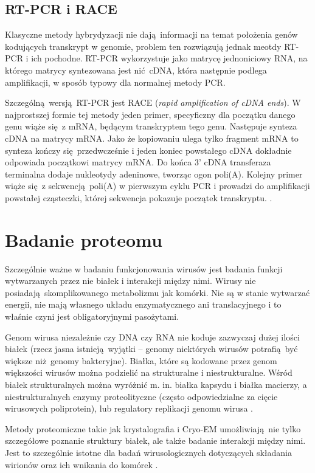 \documentclass[two column, twoside, a4paper]{article}
\begin{document}
\subsection{RT-PCR i RACE}

Klasyczne metody hybrydyzacji nie dają informacji na temat położenia genów kodujących transkrypt w genomie, problem ten rozwiązują jednak meotdy RT-PCR i ich pochodne. RT-PCR wykorzystuje jako matrycę jednoniciowy RNA, na którego matrycy syntezowana jest nić cDNA, która następnie podlega amplifikacji, w sposób typowy dla normalnej metody PCR.

Szczególną wersją RT-PCR jest RACE (\textit{rapid amplification of cDNA ends}). W najprostszej formie tej metody jeden primer, specyficzny dla początku danego genu  wiąże się z mRNA, będącym transkryptem tego genu. Następuje synteza cDNA na matrycy mRNA. Jako że kopiowaniu ulega tylko fragment mRNA to synteza kończy się przedwcześnie i jeden koniec powstałego cDNA dokładnie odpowiada początkowi matrycy mRNA. Do końca 3' cDNA transferaza terminalna dodaje nukleotydy adeninowe, tworząc ogon poli(A). Kolejny primer wiąże się z sekwencją poli(A) w pierwszym cyklu PCR i prowadzi do amplifikacji powstałej cząsteczki, której sekwencja pokazuje początek transkryptu. \autocite{Brown2019}.

\section{Badanie proteomu}

Szczególnie ważne w badaniu funkcjonowania wirusów jest badania funkcji wytwarzanych przez nie białek i interakcji między nimi. Wirusy nie posiadają skomplikowanego metabolizmu jak komórki. Nie są w stanie wytwarzać energii, nie mają własnego układu enzymatycznego ani translacyjnego i to właśnie czyni jest obligatoryjnymi pasożytami.

Genom wirusa niezależnie czy DNA czy RNA nie koduje zazwyczaj dużej ilości białek (rzecz jasna istnieją wyjątki -- genomy niektórych wirusów potrafią być większe niż genomy bakteryjne). Białka, które są kodowane przez genom większości wirusów można podzielić na strukturalne i niestrukturalne. Wśród białek strukturalnych można wyróżnić m. in. białka kapsydu i białka macierzy, a niestrukturalnych enzymy proteolityczne (często odpowiedzialne za cięcie wirusowych poliprotein), lub regulatory replikacji genomu wirusa \autocite{Piekarowicz2013}.

Metody proteomiczne takie jak krystalografia i  Cryo-EM umożliwiają nie tylko szczegółowe poznanie struktury białek, ale także badanie interakcji między nimi. Jest to szczególnie istotne dla badań wirusologicznych dotyczących składania wirionów oraz ich wnikania do komórek \autocite{Rossmann2000}.
\end{document}
